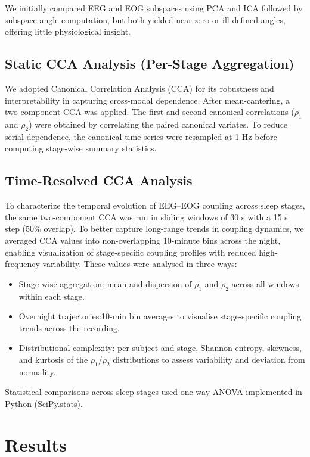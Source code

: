 We initially compared EEG and EOG subspaces using PCA and ICA followed by subspace angle computation, but both yielded near-zero or ill-defined angles, offering little physiological insight. 

\subsection{Static CCA Analysis (Per-Stage Aggregation)}

We adopted Canonical Correlation Analysis (CCA) for its robustness and interpretability in capturing cross-modal dependence. After mean-cantering, a two-component CCA was applied. The first and second canonical correlations ($\rho_1$ and $\rho_2$) were obtained by correlating the paired canonical variates. To reduce serial dependence, the canonical time series were resampled at 1 Hz before computing stage-wise summary statistics.

\subsection{Time-Resolved CCA Analysis}

To characterize the temporal evolution of EEG–EOG coupling across sleep stages, the same two-component CCA was run in sliding windows of 30 s with a 15 s step ($50\%$ overlap). To better capture long-range trends in coupling dynamics, we averaged CCA values into non-overlapping 10-minute bins across the night, enabling visualization of stage-specific coupling profiles with reduced high-frequency variability. These values were analysed in three ways:
\begin{itemize}
    \item Stage-wise aggregation: mean and dispersion of $\rho_1$ and $\rho_2$ across all windows within each stage.
    \item Overnight trajectories:10-min bin averages to visualise stage-specific coupling trends across the recording.
    \item Distributional complexity: per subject and stage, Shannon entropy, skewness, and kurtosis of the $\rho_1$/$\rho_2$ distributions to assess variability and deviation from normality.
\end{itemize}

Statistical comparisons across sleep stages used one-way ANOVA implemented in Python (SciPy.stats).

\section{Results}

